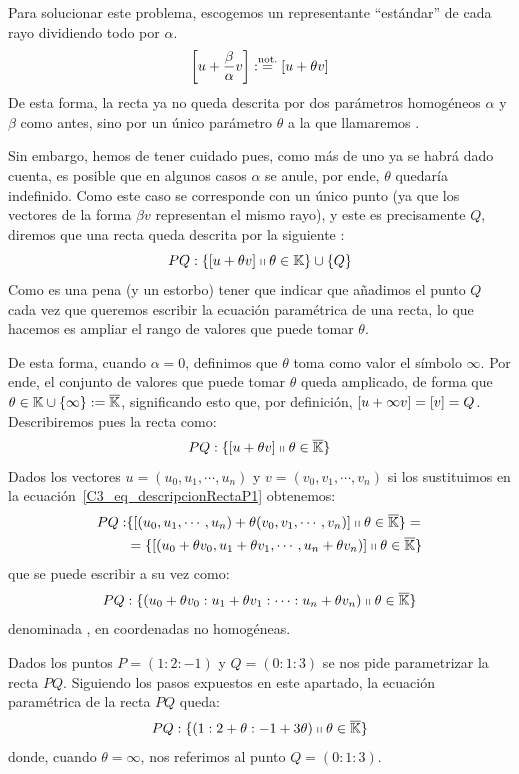 Para solucionar este problema, escogemos un representante ``estándar'' de cada rayo dividiendo todo por $\alpha$.
\[\left [ u+\frac{\beta}{\alpha}v \right ]:\stackrel{\textrm{not.}}{=}\left [ u+\theta v \right ]\]
De esta forma, la recta ya no queda descrita por dos parámetros homogéneos $\alpha$ y $\beta$ como antes, sino por un único parámetro $\theta$ a la que llamaremos .
	
Sin embargo, hemos de tener cuidado pues, como más de uno ya se habrá dado cuenta, es posible que en algunos casos $\alpha$ se anule, por ende, $\theta$ quedaría indefinido. Como este caso se corresponde con un único punto (ya que los vectores de la forma $\beta v$ representan el mismo rayo), y este es precisamente $Q$, diremos que una recta queda descrita por la siguiente :
\begin{equation}
	\label{C3_eq_descripcionRecta}
	PQ:\{\left [ u+\theta v \right ]\shortparallel \theta\in\mathbb{K}\}\cup\{Q\}
\end{equation}
Como es una pena (y un estorbo) tener que indicar que añadimos el punto $Q$ cada vez que queremos escribir la ecuación paramétrica de una recta, lo que hacemos es ampliar el rango de valores que puede tomar $\theta$.

De esta forma, cuando $\alpha=0$, definimos que $\theta$ toma como valor el símbolo $\infty$. Por ende, el conjunto de valores que puede tomar $\theta$ queda amplicado, de forma que $\theta\in\mathbb{K}\cup\{\infty\}:=\overline{\mathbb{K}}$, significando esto que, por definición, $\left [ u+\infty v \right ]=\left [ v \right ]=Q$. Describiremos pues la recta como:
\begin{equation}
	\label{C3_eq_descripcionRectaP1}
	PQ:\{\left [ u+\theta v \right ]\shortparallel \theta\in\overline{\mathbb{K}}\}
\end{equation}
Dados los vectores $u=(u_0,u_1,\cdots,u_n)$ y $v=(v_0,v_1,\cdots,v_n)$ si los sustituimos en la ecuación~\eqref{C3_eq_descripcionRectaP1} obtenemos:
\begin{equation*}
	\label{C_3_eq_parametrica_recta}
	\begin{split}
		PQ:&\{\left [ (u_0,u_1,\cdots,u_n)+\theta(v_0,v_1,\cdots,v_n) \right ]\shortparallel \theta\in\overline{\mathbb{K}}\}=\\
		&=\{\left [ (u_0+\theta v_0,u_1+\theta v_1,\cdots,u_n+\theta v_n) \right ]\shortparallel \theta\in\overline{\mathbb{K}}\}
	\end{split}
\end{equation*}
que se puede escribir a su vez como: 
\begin{equation}
	PQ:\{(u_0+\theta v_0:u_1+\theta v_1:\cdots:u_n+\theta v_n)\shortparallel \theta\in\overline{\mathbb{K}}\}
\end{equation}
denominada , en coordenadas no homogéneas.
\begin{exa}
	\label{C3_exa_rectaConcreta}
	Dados los puntos $P=(1:2:-1)$ y $Q=(0:1:3)$ se nos pide parametrizar la recta $PQ$. Siguiendo los pasos expuestos en este apartado, la ecuación paramétrica de la recta $PQ$ queda:
	\[
	PQ:\{(1:2+\theta:-1+3\theta)\shortparallel\theta\in\overline{\mathbb{K}}\}
	\]
	donde, cuando $\theta=\infty$, nos referimos al punto $Q=(0:1:3)$.
\end{exa}

